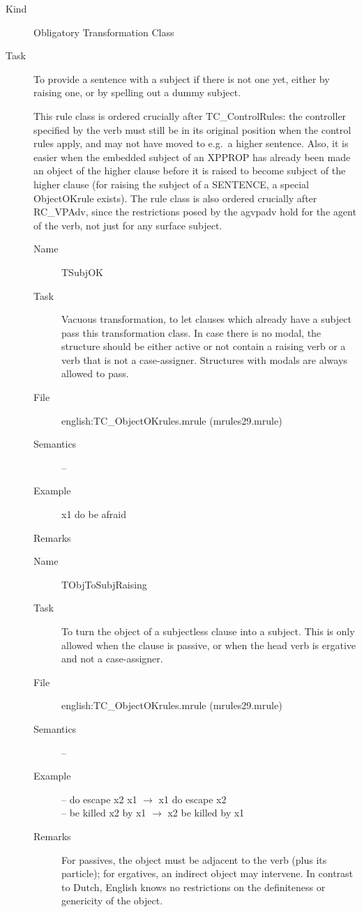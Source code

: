 \begin{description}
\item[Kind] Obligatory Transformation Class
\item[Task] To provide a sentence with a subject if there is not one yet, 
either by raising one, or by spelling out a dummy subject.

This rule class is ordered crucially after TC\_ControlRules: the controller 
specified by the verb must still be in its original position when the control 
rules apply, and may not have moved to e.g.\ a higher sentence. Also, 
it is easier when the embedded 
subject of an XPPROP has already been made an object of the higher clause 
before it is raised to become subject of the higher clause (for raising 
the subject of a SENTENCE, a special ObjectOKrule exists). 
The rule class is also ordered crucially after RC\_VPAdv, since 
the restrictions 
posed by the agvpadv hold for the agent of the verb, not just for any 
surface subject.

\vspace{1 cm}
\begin{description}
\item[Name] TSubjOK
\item[Task] Vacuous transformation, to let clauses which already have a 
subject pass this transformation class. In case there is no modal, the 
structure should be either active or not contain a raising verb or a verb that 
is not a case-assigner. Structures with modals are always allowed to pass.
\item[File] english:TC\_ObjectOKrules.mrule (mrules29.mrule)
\item[Semantics] --
\item[Example] x1 do be afraid 
\item[Remarks] 
\end{description}

\vspace{1 cm}
\begin{description}
\item[Name] TObjToSubjRaising
\item[Task] To turn the object of a subjectless clause into a subject. This is 
only allowed when the clause is passive, or when the head verb is ergative and 
not a case-assigner.
\item[File] english:TC\_ObjectOKrules.mrule (mrules29.mrule)
\item[Semantics] --
\item[Example] \mbox{}
-- do escape x2 x1 $\rightarrow$ x1 do escape x2 \\
-- be killed x2 by x1 $\rightarrow$ x2 be killed by x1
\item[Remarks] For passives, the object must be adjacent to the verb (plus its 
particle); for ergatives, an indirect object may intervene. In contrast to 
Dutch, English knows no restrictions on the definiteness or genericity of the 
object.
\end{description}


\end{description}

